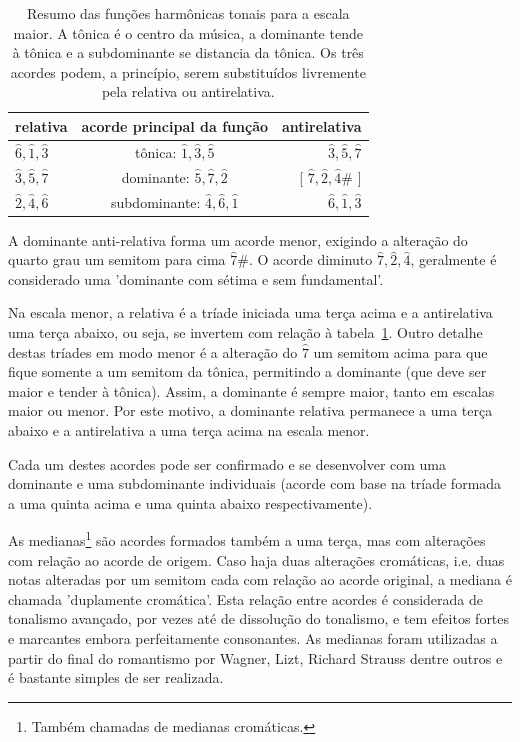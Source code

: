\begin{table}[htpq!]
\centering
\caption{Resumo das funções harmônicas tonais para a escala maior. A tônica é o centro da música, a dominante tende à tônica e a subdominante se distancia da tônica. Os três acordes podem, a princípio, serem substituídos livremente pela relativa ou antirelativa.}
\begin{tabular}{l | c | r}
relativa & acorde principal da função & antirelativa \\\hline\hline
$\hat{6},\hat{1},\hat{3}$ & tônica:       $\hat{1},\hat{3},\hat{5}$ & $\hat{3}, \hat{5},      \hat{7}$ \\
$\hat{3},\hat{5},\hat{7}$ & dominante:    $\hat{5},\hat{7},\hat{2}$ & [ $\hat{7},\hat{2},\hat{4}\#$ ] \\
$\hat{2},\hat{4},\hat{6}$ & subdominante: $\hat{4},\hat{6},\hat{1}$ & $\hat{6},\hat{1},       \hat{3}$
\end{tabular}
\label{tab:harmonia}
\end{table}

A dominante anti-relativa forma um acorde menor, exigindo a alteração do quarto grau um semitom para cima $\hat{7}\#$. O acorde diminuto $\hat{7},\hat{2},\hat{4}$, geralmente é considerado uma 'dominante com sétima e sem fundamental'.\cite{Koellheuteur}

Na escala menor, a relativa é a tríade iniciada uma terça acima e a antirelativa uma terça abaixo,
ou seja, se invertem com relação à tabela~\ref{tab:harmonia}. Outro detalhe destas tríades em modo
menor é a alteração do $\hat{7}$ um semitom acima para que fique somente a um semitom da tônica,
permitindo a dominante (que deve ser maior e tender à tônica). Assim, a dominante é sempre maior, tanto em escalas maior ou menor. Por este motivo, a dominante relativa permanece a uma terça abaixo e a antirelativa a uma terça acima na escala menor.

Cada um destes acordes pode ser confirmado e se desenvolver com uma dominante e uma subdominante individuais (acorde com base na tríade formada a uma quinta acima e uma quinta abaixo respectivamente).

As medianas\footnote{Também chamadas de medianas cromáticas.} são acordes formados também a uma terça, mas com alterações com relação ao acorde de origem. Caso haja duas alterações cromáticas, i.e. duas notas alteradas por um semitom cada com relação ao acorde original, a mediana é chamada 'duplamente cromática'. Esta relação entre acordes é considerada de tonalismo avançado, por vezes até de dissolução do tonalismo, e tem efeitos fortes e marcantes embora perfeitamente consonantes. As medianas foram utilizadas a partir do final do romantismo por Wagner, Lizt, Richard Strauss dentre outros e é bastante simples de ser realizada.\cite{Harmonia,Salzer}

